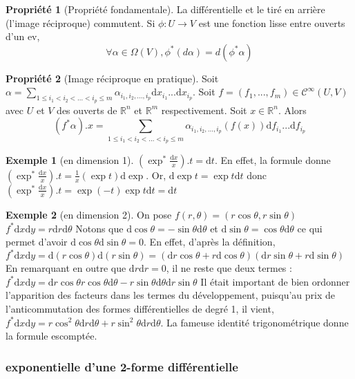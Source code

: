 \documentclass{article}
\newcommand{\R}{\mathbb{R}} %
\theoremstyle{definition} %
\newtheorem{ex}{Exemple}
\newtheorem{propri}{Propriété}
\newcommand{\dd}{ \mathrm{d}}
\newcommand{\1}{\mathbb{1}} %
\begin{document}
\begin{propri}[Propriété fondamentale]
La différentielle et le tiré en arrière (l'image réciproque) commutent.
Si $\phi :U \to V$ est une fonction lisse entre ouverts d'un ev,
$$\forall \alpha \in \Omega(V), \phi ^* (d\alpha) = d(\phi ^* \alpha)$$
\end{propri}

\begin{propri}[Image réciproque en pratique]
Soit $\alpha = \sum_{1 \leq i_1 < i_2 < ... <i_p \leq m} \alpha_{i_1, i_2, ... , i_p} \dd x_{i_1} ... \dd x_{i_p}$.
Soit $f=(f_1,...,f_m) \in \mathcal{C}^\infty (U,V)$ avec $U$ et $V$ des ouverts de $\R^n$ et $\R^m$ respectivement.
Soit $x \in \R^n$.
Alors $$(f^* \alpha).x = \sum_{1 \leq i_1 < i_2 < ... <i_p \leq m} \alpha_{i_1, i_2, ... , i_p}(f(x)) \dd f_{i_1} ... \dd f_{i_p}$$
\end{propri}


\begin{ex}[en dimension 1]
$(\exp^* \frac{\dd x}{x} ).t = \dd t$.
En effet,
la formule donne $(\exp^* \frac{\dd x}{x}).t = \frac{1}{x}(\exp t) \dd \exp $.
Or, $\dd \exp t = \exp t \dd t$ donc $(\exp^* \frac{\dd x}{x}).t = \exp (-t) \exp t \dd t = \dd t $
\end{ex}

\begin{ex}[en dimension 2]
On pose $f(r,\theta)=(r \cos \theta, r \sin \theta)$
$f^* \dd x \dd y = r \dd r \dd \theta$
Notons que $\dd \cos \theta = - \sin \theta \dd \theta$ et $\dd \sin \theta = \cos \theta \dd \theta$ ce qui permet d'avoir $\dd \cos \theta \dd \sin \theta=0$.
En effet, d'après la définition,
$f^* \dd x \dd y = \dd (r \cos \theta) \dd (r \sin \theta) = (\dd r \cos \theta + r \dd \cos \theta)(\dd r \sin \theta + r \dd \sin \theta)$
En remarquant en outre que $\dd r \dd r=0$, il ne reste que deux termes :
$f^* \dd x \dd y = \dd r \cos \theta r \cos \theta \dd \theta - r \sin \theta \dd \theta \dd r \sin \theta$
Il était important de bien ordonner l'apparition des facteurs dans les termes du développement, puisqu'au prix de l'anticommutation des formes différentielles de degré 1, il vient,
$f^* \dd x \dd y = r \cos^2 \theta \dd r \dd \theta + r \sin^2 \theta \dd r \dd \theta$.
La fameuse identité trigonométrique donne la formule escomptée.
\end{ex}

\subsubsection{exponentielle d'une 2-forme différentielle}
\end{document}
